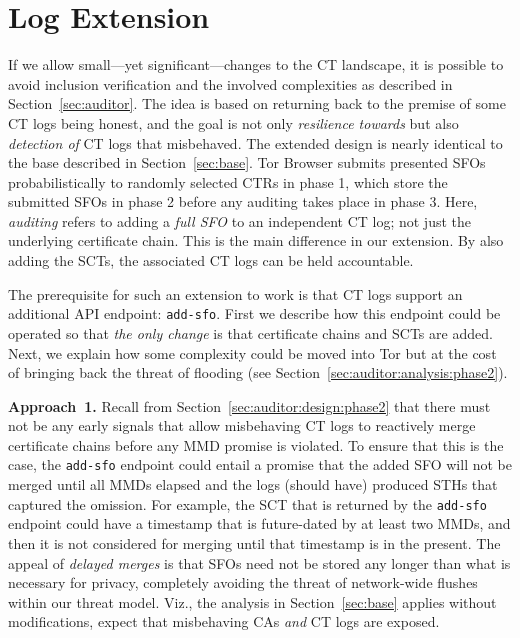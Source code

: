 \section{Log Extension} \label{sec:log}
If we allow small---yet significant---changes to the CT landscape, it is
possible to avoid inclusion verification and the involved complexities as
described in Section~\ref{sec:auditor}.  The idea is based on returning back to
the premise of some CT logs being honest, and the goal is not only
\emph{resilience towards} but also \emph{detection of} CT logs that misbehaved.
The extended design is nearly identical to the base described in
Section~\ref{sec:base}.
	Tor Browser submits presented SFOs probabilistically to randomly selected
		CTRs in phase 1,
	which store the submitted SFOs in phase 2 before any auditing takes place in
		phase 3.
Here, \emph{auditing} refers to adding a \emph{full SFO} to an independent CT
log; not just the underlying certificate chain.  This is the main difference in
our extension.  By also adding the SCTs, the associated CT logs can be held
accountable.

The prerequisite for such an extension to work is that CT logs support an
additional API endpoint:
	\texttt{add-sfo}.
First we describe how this endpoint could be operated so that \emph{the only
change} is that certificate chains and SCTs are added.  Next, we explain how
some complexity could be moved into Tor but at the cost of bringing back the
threat of flooding (see Section~\ref{sec:auditor:analysis:phase2}).

\textbf{Approach~1.}
Recall from Section~\ref{sec:auditor:design:phase2} that there must not be any
early signals that allow misbehaving CT logs to reactively merge certificate
chains before any MMD promise is violated.  To ensure that this is the case, the
\texttt{add-sfo} endpoint could entail a promise that the added SFO will not be
merged until all MMDs elapsed and the logs (should have) produced STHs that
captured the omission.  For example, the SCT that is returned by the
\texttt{add-sfo} endpoint could have a timestamp that is future-dated by at
least two MMDs, and then it is not considered for merging until that timestamp
is in the present.  The appeal of \emph{delayed merges} is that SFOs need not
be stored any longer than what is necessary for privacy, completely avoiding
the threat of network-wide flushes within our threat model.  Viz., the analysis
in Section~\ref{sec:base} applies without modifications, expect that misbehaving
CAs \emph{and} CT logs are exposed.

